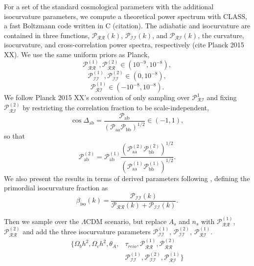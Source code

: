 \documentclass{emulateapj}
\newcommand\prr{ \mathcal{P}_{\mathcal{R}\mathcal{R}} }
\newcommand\pri{ \mathcal{P}_{\mathcal{R}\mathcal{I}} }
\newcommand\pii{ \mathcal{P}_{\mathcal{I}\mathcal{I}} }
\begin{document}
For a set of the standard cosmological parameters with the additional isocurvature parameters, we compute a theoretical power spectrum with CLASS, a fast Boltzmann code written in C (citation). The adiabatic and isocurvature are contained in three functions, $\mathcal{P}_{\mathcal{RR}}(k)$, $\mathcal{P}_{\mathcal{II}}(k)$, and $\mathcal{P}_{\mathcal{RI}}(k)$, the curvature, isocurvature, and cross-correlation power spectra, respectively (cite Planck 2015 XX).  We use the same uniform priors as Planck,
\begin{equation}
    \prr^{(1)}, \prr^{(2)} \in (10^{-9}, 10^{-8}),
\end{equation}
\begin{equation}
    \pii^{(1)}, \pii^{(2)} \in (0, 10^{-8}),
\end{equation}
\begin{equation}
    \pri^{(1)} \in (-10^{-8}, 10^{-8}).
\end{equation}
We follow Planck 2015 XX's convention of only sampling over $\pri^1$ and fixing $\pri^{(2)}$ by restricting the correlation fraction to be scale-independent,
\begin{equation}
\cos \Delta_{\text{ab}} = \frac{\mathcal{P}_{\text{ab}}}{(\mathcal{P}_{\text{aa}} \mathcal{P}_{\text{bb}})^{1/2}} \in (-1,1),
\end{equation}
so that
\begin{equation}
\mathcal{P}_{\text{ab}}^{(2)} = \mathcal{P}_{\text{ab}}^{(1)} \frac{\left(\mathcal{P}_{\text{aa}}^{(2)} \mathcal{P}_{\text{bb}}^{(2)} \right)^{1/2}}{ \left(\mathcal{P}_{\text{aa}}^{(1)} \mathcal{P}_{\text{bb}}^{(1)} \right)^{1/2}}.
\end{equation}
We also present the results in terms of derived parameters following \cite{planckXX:2015}, defining the primordial isocurvature fraction as
\begin{equation}
\beta_{\text{iso}}(k) = \frac{\pii(k)}{\prr(k) + \pii(k)}.
\end{equation}

Then we sample over the $\Lambda$CDM scenario, but replace $A_s$ and $n_s$ with $\prr^{(1)}$,  $\prr^{(2)}$ and add the three isocurvature parameters $\pii^{(1)}$, $\pii^{(2)}$, $\pri^{(1)}$.
\begin{align}
\{ \Omega_b h^2, \Omega_c h^2, \theta_A, &\tau_{reio}, \prr^{(1)}, \mathcal{P}_{\mathcal{RR}}^{(2)} \\
& \pii^{(1)}, \pii^{(2)}, \pri^{(1)}    \}
\end{align}
\end{document}
